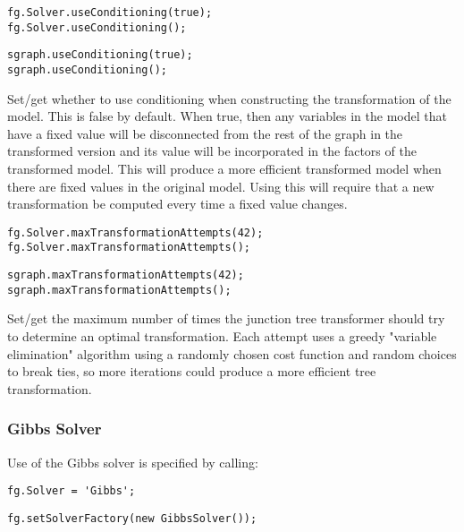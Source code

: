 
\ifmatlab
\begin{lstlisting}
fg.Solver.useConditioning(true);
fg.Solver.useConditioning();
\end{lstlisting}
\fi

\ifjava
\begin{lstlisting}
sgraph.useConditioning(true);
sgraph.useConditioning();
\end{lstlisting}
\fi

Set/get whether to use conditioning when constructing the transformation of the model. This is false by default. When true, then any variables in the model that have a fixed value will be disconnected from the rest of the graph in the transformed version and its value will be incorporated in the factors of the transformed model. This will produce a more efficient transformed model when there are fixed values in the original model. Using this will require that a new transformation be computed every time a fixed value changes.


\ifmatlab
\begin{lstlisting}
fg.Solver.maxTransformationAttempts(42);
fg.Solver.maxTransformationAttempts();
\end{lstlisting}
\fi

\ifjava
\begin{lstlisting}
sgraph.maxTransformationAttempts(42);
sgraph.maxTransformationAttempts();
\end{lstlisting}
\fi

Set/get the maximum number of times the junction tree transformer should try to determine an optimal transformation. Each attempt uses a greedy "variable elimination" algorithm using a randomly chosen cost function and random choices to break ties, so more iterations could produce a more efficient tree transformation.

\textsl{}
\subsubsection{Gibbs Solver}
\label{sec:GibbsSolverAPI}

Use of the Gibbs solver is specified by calling:

\ifmatlab
\begin{lstlisting}
fg.Solver = 'Gibbs';
\end{lstlisting}
\fi


\ifjava
\begin{lstlisting}
fg.setSolverFactory(new GibbsSolver());
\end{lstlisting}
\fi

